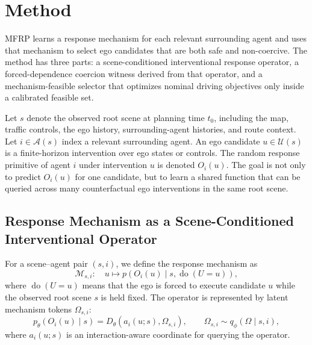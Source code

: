 \documentclass[10pt]{article}
\newcommand{\framework}{MFRP}
\newcommand{\cA}{\mathcal{A}}
\newcommand{\cM}{\mathcal{M}}
\newcommand{\cU}{\mathcal{U}}
\begin{document}
\section{Method}
\label{sec:method}

\framework{} learns a response mechanism for each relevant surrounding agent and uses that mechanism to select ego candidates that are both safe and non-coercive. The method has three parts: a scene-conditioned interventional response operator, a forced-dependence coercion witness derived from that operator, and a mechanism-feasible selector that optimizes nominal driving objectives only inside a calibrated feasible set.

Let \(s\) denote the observed root scene at planning time \(t_0\), including the map, traffic controls, the ego history, surrounding-agent histories, and route context. Let \(i\in\cA(s)\) index a relevant surrounding agent. An ego candidate \(u\in\cU(s)\) is a finite-horizon intervention over ego states or controls. The random response primitive of agent \(i\) under intervention \(u\) is denoted \(O_i(u)\). The goal is not only to predict \(O_i(u)\) for one candidate, but to learn a shared function that can be queried across many counterfactual ego interventions in the same root scene.

\subsection{Response Mechanism as a Scene-Conditioned Interventional Operator}
\label{sec:method_response_mechanism}

For a scene--agent pair \((s,i)\), we define the response mechanism as
\begin{equation}
    \cM_{s,i}:\quad
    u \mapsto p\!\left(O_i(u)\mid s,\operatorname{do}(U=u)\right),
    \label{eq:response_operator}
\end{equation}
where \(\operatorname{do}(U=u)\) means that the ego is forced to execute candidate \(u\) while the observed root scene \(s\) is held fixed. The operator is represented by latent mechanism tokens \(\Omega_{s,i}\):
\begin{equation}
    p_\theta\!\left(O_i(u)\mid s\right)
    =
    D_\theta\!\left(a_i(u;s),\Omega_{s,i}\right),
    \qquad
    \Omega_{s,i}\sim q_\phi(\Omega\mid s,i),
    \label{eq:latent_mechanism}
\end{equation}
where \(a_i(u;s)\) is an interaction-aware coordinate for querying the operator.
\end{document}
